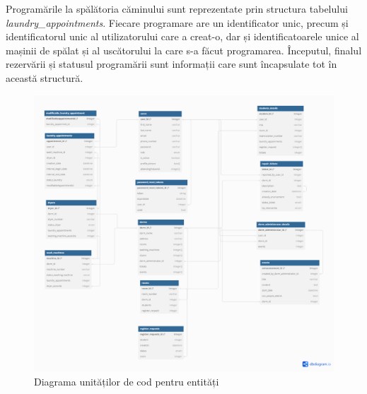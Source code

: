 \documentclass[12pt,a4paper]{report}
\theoremstyle{definition}
\theoremstyle{remark}
\begin{document}
\par Programările la spălătoria căminului sunt reprezentate prin structura tabelului \textit{laundry\_appointments}. Fiecare programare are un identificator unic, precum și identificatorul unic al utilizatorului care a creat-o, dar și identificatoarele unice al mașinii de spălat și al uscătorului la care s-a făcut programarea. Începutul, finalul rezervării  și statusul programării sunt informații care sunt încapsulate tot în această structură.

\begin{figure}[H]
    \centering
    \includegraphics[width=1\linewidth]{resurse/diagrame/DB_Diagram.png}
    \caption{Diagrama unităților de cod pentru entități}
\end{figure}



\end{document}
